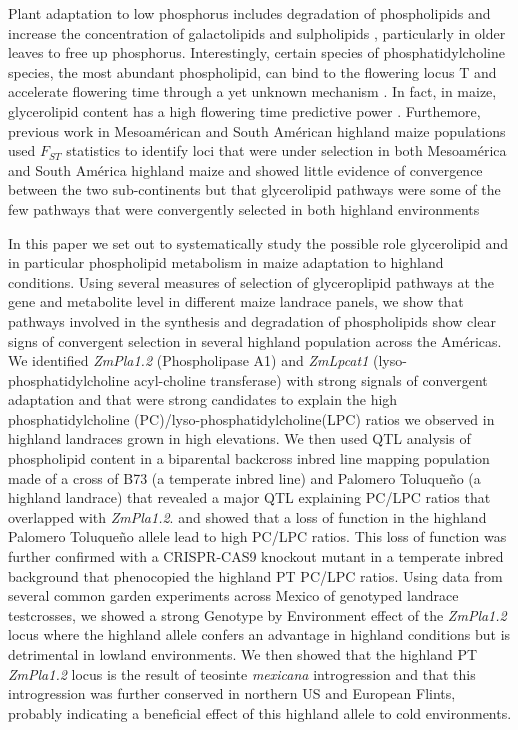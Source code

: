 \documentclass[9pt,twocolumn,twoside]{BioRxiv}
\begin{document}
Plant adaptation to low phosphorus includes degradation of phospholipids and increase the concentration of galactolipids and sulpholipids \cite{Lambers2012-an}, particularly in older leaves to free up phosphorus. 
Interestingly, certain species of phosphatidylcholine species, the most abundant phospholipid, can bind to the flowering locus T and accelerate flowering time through a yet unknown mechanism \cite{Nakamura2014-qf}. 
In fact, in maize, glycerolipid content has a high flowering time predictive power \cite{Riedelsheimer2013-bd}. 
Furthemore, previous work in Mesoamérican and South Américan highland maize populations 
used $F_{ST}$ statistics to identify loci that were under selection in both Mesoamérica and South América highland maize and showed little evidence of convergence between the two sub-continents but that glycerolipid pathways were some of the few pathways that were convergently selected in both highland environments  \citep{Takuno2015-uj}

In this paper we set out to systematically study the possible role glycerolipid and in particular phospholipid metabolism in maize adaptation to highland conditions. 
Using several measures of selection of glyceroplipid pathways at the gene and metabolite level in different maize landrace panels, we show that pathways involved in the synthesis and degradation of phospholipids show clear signs of convergent selection in several highland population across the Américas. 
We identified \textit{ZmPla1.2} (Phospholipase A1) and \textit{ZmLpcat1} (lyso-phosphatidylcholine acyl-choline transferase) with strong signals of convergent adaptation and that were strong candidates to explain the high phosphatidylcholine (PC)/lyso-phosphatidylcholine(LPC) ratios we observed in highland landraces grown in high elevations. 
We then used QTL analysis of phospholipid content in a biparental backcross inbred line mapping population made of a cross of B73 (a temperate inbred line)  and Palomero Toluqueño (a highland landrace) that revealed a major QTL explaining PC/LPC ratios that overlapped with \textit{ZmPla1.2}. and showed that a loss of function in the highland Palomero Toluqueño allele lead to high PC/LPC ratios. 
This loss of function was further confirmed with a CRISPR-CAS9 knockout mutant in a temperate inbred background that phenocopied the highland PT PC/LPC ratios. 
Using data from several common garden experiments across Mexico of genotyped landrace testcrosses, we showed a strong Genotype by Environment effect of the \textit{ZmPla1.2} locus where the highland allele confers an advantage in highland conditions but is detrimental in lowland environments. 
We then showed that the highland PT \textit{ZmPla1.2} locus is the result of teosinte \textit{mexicana} introgression and that this introgression was further conserved in northern US and European Flints, probably indicating a beneficial effect of this highland allele to cold environments. 
\end{document}
